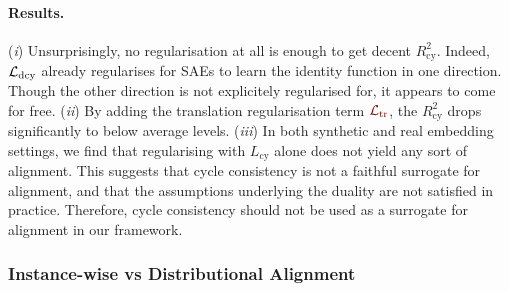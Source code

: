 \documentclass{article}
\begin{document}
\paragraph{Results.}
(\emph{i}) Unsurprisingly, no regularisation at all is enough to get decent $R^2_{\mathrm{cy}}$. Indeed, $\mathcal{L}_{\mathrm{dcy}}$ already regularises for SAEs to learn the identity function in one direction. Though the other direction is not explicitely regularised for, it appears to come for free.
%
(\emph{ii}) By adding the translation regularisation term $\Ltr$, the $R^2_{\mathrm{cy}}$ drops significantly to below average levels.
%
(\emph{iii}) In both synthetic and real embedding settings, we find that regularising with $L_{\mathrm{cy}}$ alone does not yield any sort of alignment. This suggests that cycle consistency is not a faithful surrogate for alignment, and that the assumptions underlying the duality are not satisfied in practice. Therefore, cycle consistency should not be used as a surrogate for alignment in our framework.

\begin{table}[h]
  \centering
  \caption{\textbf{There is no empirical link between cycle consistency and alignment quality.} SAE quality on \textbf{vision embeddings} under different regularisation regimes.}
  \label{tab:cycle_consistency_real}
\end{table}

\subsubsection{Instance-wise vs Distributional Alignment}
\label{sec:instance_vs_distribution_alignment}
\end{document}
